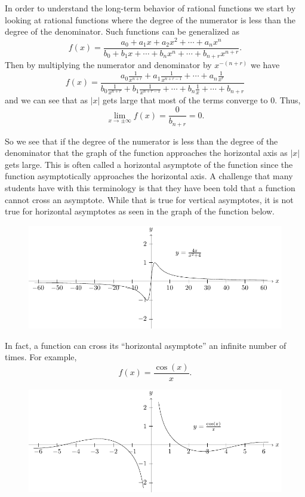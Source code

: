 \documentclass[
]{book}
\theoremstyle{definition}
\theoremstyle{definition}
\theoremstyle{definition}
\theoremstyle{definition}
\theoremstyle{remark}
\begin{document}
In order to understand the long-term behavior of rational functions we start by looking at rational functions where the degree of the numerator is less than the degree of the denominator. Such functions can be generalized as
\[f(x) = \frac{ a_0 + a_1 x + a_2 x^2 + \cdots + a_n x^n}{b_0 + b_1 x + \cdots + b_n x^n +\cdots +b_{n+r}x^{n+r}}.\]
Then by multiplying the numerator and denominator by \(x^{-(n+r)}\) we have
\[f(x) = \frac{ a_0\frac{1}{x^{n+r}} + a_1 \frac{1}{x^{n+r-1}} + \cdots + a_n \frac{1}{x^{r}}}{b_0 \frac{1}{x^{n+r}} + b_1 \frac{1}{x^{n+r-1}} + \cdots + b_n \frac{1}{x} +\cdots +b_{n+r}}\] and we can see that as \(|x|\) gets large that most of the terms converge to \(0\). Thus,
\[\lim_{x\rightarrow \pm \infty} f(x) = \frac{0}{b_{n+r}} = 0.\]

So we see that if the degree of the numerator is less than the degree of the denominator that the graph of the function approaches the horizontal axis as \(|x|\) gets large. This is often called a horizontal asymptote of the function since the function asymptotically approaches the horizontal axis. A challenge that many students have with this terminology is that they have been told that a function cannot cross an asymptote. While that is true for vertical asymptotes, it is not true for horizontal asymptotes as seen in the graph of the function below.

\begin{figure}

{\centering \includegraphics[width=0.5\linewidth]{tikz/rational3} 

}

\end{figure}

In fact, a function can cross its ``horizontal asymptote'' an infinite number of times. For example,
\[f(x)=\frac{\cos(x)}{x}.\]

\begin{figure}

{\centering \includegraphics[width=0.5\linewidth]{tikz/rational4} 

}

\end{figure}
\end{document}
